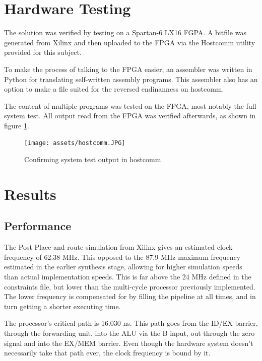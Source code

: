 \section{Hardware Testing}

The solution was verified by testing on a Spartan-6 LX16 FGPA.
A bitfile was generated from Xilinx and then uploaded to the FPGA via the Hostcomm utility \cite{hostcomm} provided for this subject. 

To make the process of talking to the FPGA easier, an assembler was written in Python for translating self-written assembly programs.
This assembler also has an option to make a file suited for the reversed endinanness on hostcomm.

The content of multiple programs was tested on the FPGA, most notably the full system test.
All output read from the FPGA was verified afterwards, as shown in figure \ref{fig:verify_hostcomm}.

\begin{figure}[H]
  \begin{center}
    \texttt{[image: assets/hostcomm.JPG]}
  \end{center}
  \caption{Confirming system test output in hostcomm}
  \label{fig:verify_hostcomm}
\end{figure}


\section{Results}

\subsection{Performance}

The Post Place-and-route simulation from Xilinx gives an estimated clock frequency of 62.38 MHz.
This opposed to the 87.9 MHz maximum frequency estimated in the earlier synthesis stage, allowing for higher simulation speeds than actual implementation speeds.
This is far above the 24 MHz defined in the constraints file, but lower than the multi-cycle processor previously implemented.
The lower frequency is compensated for by filling the pipeline at all times, and in turn getting a shorter executing time.

The processor's critical path is 16.030 ns.
This path goes from the ID/EX barrier, through the forwarding unit, into the ALU via the B input, out through the zero signal and into the EX/MEM barrier.
Even though the hardware system doesn't necessarily take that path ever, the clock frequency is bound by it.

